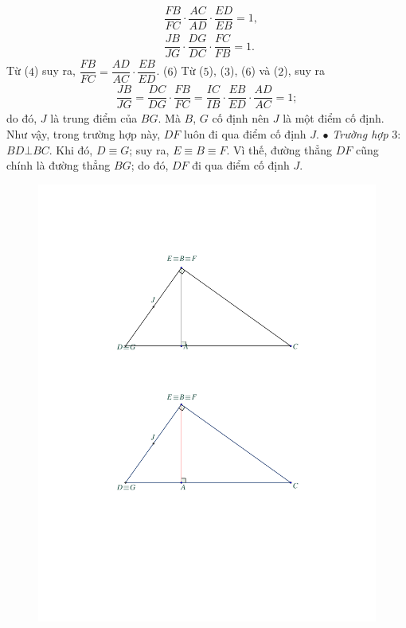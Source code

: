\begin{multicols}{2}
	\begin{align*}
		&\dfrac{{FB}}{{FC}} \cdot \dfrac{{AC}}{{AD}} \cdot \dfrac{{ED}}{{EB}} = 1, \tag{$4$}\\
		&\dfrac{{JB}}{{JG}} \cdot \dfrac{{DG}}{{DC}} \cdot \dfrac{{FC}}{{FB}} = 1.\tag{$5$}
	\end{align*}
	Từ ($4$) suy ra, $\dfrac{{FB}}{{FC}} = \dfrac{{AD}}{{AC}} \cdot \dfrac{{EB}}{{ED}}$. \hfill ($6$)
	\vskip 0.05cm
	Từ ($5$), ($3$), ($6$) và ($2$), suy ra
	\begin{align*}
		\dfrac{{JB}}{{JG}} = \dfrac{{DC}}{{DG}} \cdot \dfrac{{FB}}{{FC}} = \dfrac{{IC}}{{IB}} \cdot \dfrac{{EB}}{{ED}} \cdot \dfrac{{AD}}{{AC}} = 1;
	\end{align*}
	do đó, $J$ là trung điểm của $BG$. Mà $B$, $G$ cố định nên $J$ là một điểm cố định.
	\vskip 0.05cm
	Như vậy, trong trường hợp này, $DF$ luôn đi qua điểm cố định $J$.
	\vskip 0.05cm
	$\bullet$ \textit{Trường hợp} $3$: $BD \bot BC$.
	\vskip 0.05cm
	Khi đó, $D \equiv G$; suy ra, $E \equiv B \equiv F$. Vì thế, đường thẳng $DF$ cũng chính là đường thẳng $BG$; do đó, $DF$ đi qua điểm cố định $J$.
	\begin{figure}[H]
		\centering
		\vspace*{-5pt}
		\captionsetup{labelformat= empty, justification=centering}
		\includegraphics[width=0.95\linewidth]{P615H2}

\end{figure}
\end{multicols}
